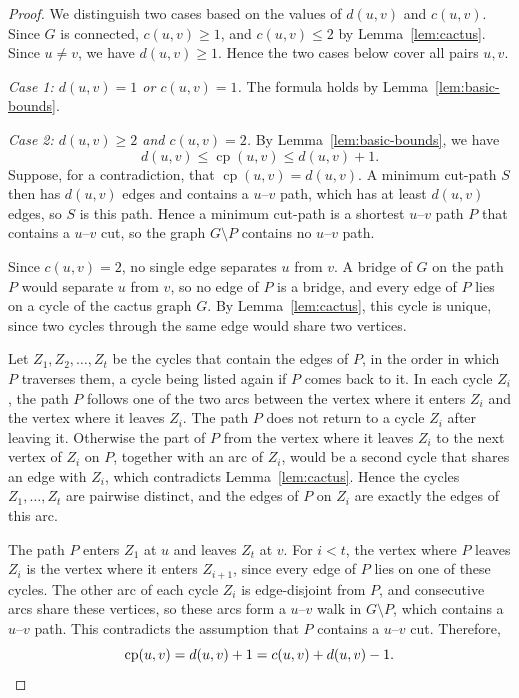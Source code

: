 \documentclass[a4paper,fleqn]{cas-sc}
\numberwithin{equation}{section}
\theoremstyle{definition}
\theoremstyle{plain}
\theoremstyle{remark}
\newcommand{\cp}{\operatorname{cp}}                  %
\begin{document}
\begin{proof}
We distinguish two cases based on the values of $d(u, v)$ and $c(u, v)$.
Since $G$ is connected, $c(u, v) \geq 1$, and $c(u, v) \leq 2$ by Lemma~\ref{lem:cactus}.
Since $u \neq v$, we have $d(u, v) \geq 1$.
Hence the two cases below cover all pairs $u, v$.

\emph{Case 1: $d(u, v) = 1$ or $c(u, v) = 1$.}
The formula holds by Lemma~\ref{lem:basic-bounds}.

\emph{Case 2: $d(u, v) \geq 2$ and $c(u, v) = 2$.}
By Lemma~\ref{lem:basic-bounds}, we have
\[
d(u, v) \leq \cp(u, v) \leq d(u, v) + 1.
\]
Suppose, for a contradiction, that $\cp(u, v) = d(u, v)$.
A minimum cut-path $S$ then has $d(u, v)$ edges and contains a $u$--$v$ path, which has at least $d(u, v)$ edges, so $S$ is this path.
Hence a minimum cut-path is a shortest $u$--$v$ path $P$ that contains a $u$--$v$ cut, so the graph $G \setminus P$ contains no $u$--$v$ path.

Since $c(u, v) = 2$, no single edge separates $u$ from $v$.
A bridge of $G$ on the path $P$ would separate $u$ from $v$, so no edge of $P$ is a bridge, and every edge of $P$ lies on a cycle of the cactus graph $G$.
By Lemma~\ref{lem:cactus}, this cycle is unique, since two cycles through the same edge would share two vertices.

Let $Z_1, Z_2, \dots, Z_t$ be the cycles that contain the edges of $P$, in the order in which $P$ traverses them, a cycle being listed again if $P$ comes back to it.
In each cycle $Z_i$, the path $P$ follows one of the two arcs between the vertex where it enters $Z_i$ and the vertex where it leaves $Z_i$.
The path $P$ does not return to a cycle $Z_i$ after leaving it.
Otherwise the part of $P$ from the vertex where it leaves $Z_i$ to the next vertex of $Z_i$ on $P$, together with an arc of $Z_i$, would be a second cycle that shares an edge with $Z_i$, which contradicts Lemma~\ref{lem:cactus}.
Hence the cycles $Z_1, \dots, Z_t$ are pairwise distinct, and the edges of $P$ on $Z_i$ are exactly the edges of this arc.

The path $P$ enters $Z_1$ at $u$ and leaves $Z_t$ at $v$.
For $i < t$, the vertex where $P$ leaves $Z_i$ is the vertex where it enters $Z_{i+1}$, since every edge of $P$ lies on one of these cycles.
The other arc of each cycle $Z_i$ is edge-disjoint from $P$, and consecutive arcs share these vertices, so these arcs form a $u$--$v$ walk in $G \setminus P$, which contains a $u$--$v$ path.
This contradicts the assumption that $P$ contains a $u$--$v$ cut.
Therefore,
\[
\cp(u, v) = d(u, v) + 1 = c(u, v) + d(u, v) - 1. \qedhere
\]
\end{proof}
\end{document}

